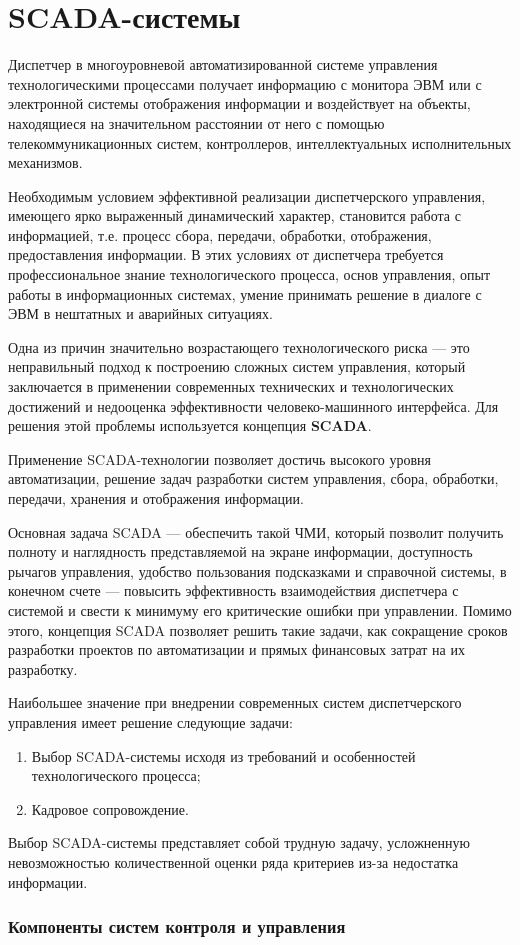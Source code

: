 \part{SCADA-системы}

Диспетчер в многоуровневой автоматизированной системе управления технологическими процессами получает информацию с монитора ЭВМ или с электронной системы отображения информации и воздействует на объекты, находящиеся на значительном расстоянии от него с помощью телекоммуникационных систем, контроллеров, интеллектуальных исполнительных механизмов.

Необходимым условием эффективной реализации диспетчерского управления, имеющего ярко выраженный динамический характер, становится работа с информацией, т.е. процесс сбора, передачи, обработки, отображения, предоставления информации. В этих условиях от диспетчера требуется профессиональное знание технологического процесса, основ управления, опыт работы в информационных системах, умение принимать решение в диалоге с ЭВМ в нештатных и аварийных ситуациях.

Одна из причин значительно возрастающего технологического риска --- это неправильный подход к построению сложных систем управления, который заключается в применении современных технических и технологических достижений и недооценка эффективности человеко-машинного интерфейса. Для решения этой проблемы используется концепция \textbf{SCADA}.

Применение SCADA-технологии позволяет достичь высокого уровня автоматизации, решение задач разработки систем управления, сбора, обработки, передачи, хранения и отображения информации.

Основная задача SCADA --- обеспечить такой ЧМИ, который позволит получить полноту и наглядность представляемой на экране информации, доступность рычагов управления, удобство пользования подсказками и справочной системы, в конечном счете --- повысить эффективность взаимодействия диспетчера с системой и свести к минимуму его критические ошибки при управлении. Помимо этого, концепция SCADA позволяет решить такие задачи, как сокращение сроков разработки проектов по автоматизации и прямых финансовых затрат на их разработку.

Наибольшее значение при внедрении современных систем диспетчерского управления имеет решение следующие задачи:

\begin{enumerate}
    \item Выбор SCADA-системы исходя из требований и особенностей технологического процесса;
    \item Кадровое сопровождение.
\end{enumerate}

Выбор SCADA-системы представляет собой трудную задачу, усложненную невозможностью количественной оценки ряда критериев из-за недостатка информации.

\section{Компоненты систем контроля и управления}
